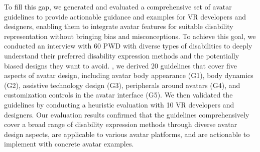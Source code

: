 
To fill this gap, we generated and evaluated a comprehensive set of avatar guidelines to provide actionable guidance and examples for VR developers and designers, enabling them to integrate avatar features for suitable disability representation without bringing bias and misconceptions. To achieve this goal, we conducted an interview with 60 PWD with diverse types of disabilities to deeply understand their preferred disability expression methods and the potentially biased designs they want to avoid. , we derived 20  %
guidelines that cover five %
aspects of avatar design, including avatar body appearance (G1), body dynamics (G2), assistive technology design (G3), peripherals around avatars (G4), and customization controls in the avatar interface (G5). %
We then validated the guidelines by conducting a heuristic evaluation with 10 VR developers and designers. %
Our evaluation results confirmed that the guidelines comprehensively cover a broad range of disability expression methods through diverse avatar design aspects, are applicable to various avatar platforms, and are actionable to implement with concrete avatar examples.  %

